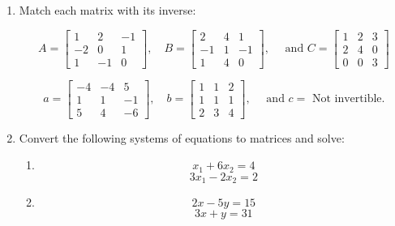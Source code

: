 \documentclass[12pt]{article}
\begin{document}
\begin{enumerate}
  
  
  \bigskip
  \item Match each matrix with its inverse:
  
  $$
    A = \begin{bmatrix} 1 & 2 & -1 \\ -2 & 0 & 1 \\ 1 & -1 & 0 \end{bmatrix}, 
    \quad 
    B = \begin{bmatrix} 2 & 4 & 1 \\ -1 & 1 & -1 \\ 1 & 4 & 0 \end{bmatrix}, 
    \quad \text{ and } 
    C = \begin{bmatrix}  1 & 2 & 3 \\ 2 & 4 & 0 \\ 0 & 0 & 3 \end{bmatrix}
  $$
  
  $$
    a = \begin{bmatrix} -4 & -4 & 5 \\ 1 & 1 & -1 \\ 5 & 4 & -6 \end{bmatrix}, 
    \quad 
    b = \begin{bmatrix} 1 & 1 & 2 \\ 1 & 1 & 1 \\ 2 & 3 & 4\end{bmatrix}, 
    \quad \text{ and } 
    c = \text{ Not invertible}.
  $$
  
  \bigskip
  \item Convert the following systems of equations to matrices and solve: 
  
  \begin{enumerate}
    \item $$x_1 + 6x_2 = 4$$ $$3 x_1 - 2x_2 = 2$$
      
    \item $$2x - 5y = 15$$ $$3x + y = 31$$ 
  \end{enumerate}
\end{enumerate}
\end{document}
